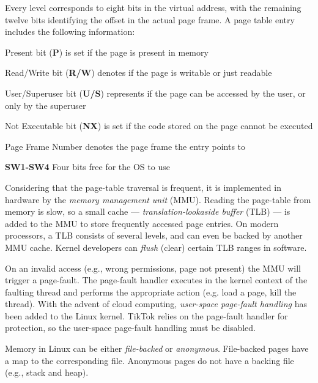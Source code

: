\documentclass[conference]{IEEEtran}
\newcommand{\sysname}{TikTok}
\begin{document}
Every level corresponds to eight bits in the virtual address, with the remaining twelve
bits identifying the offset in the actual page frame. A page table entry
includes the following information:
\begin{LaTeXdescription}
    \item[Present bit (\textbf{P})] is set if the page is present in memory
    \item[Read/Write bit (\textbf{R/W})] denotes if the page is writable or just
         readable
    \item[User/Superuser bit (\textbf{U/S})] represents if the page can be 
    accessed by the user, or only by the superuser
    \item[Not Executable bit (\textbf{NX})] is set if the code stored on the 
    page cannot be executed
    \item[Page Frame Number] denotes the page frame the entry points to
    \item[\textbf{SW1-SW4}] Four bits free for the OS to use
\end{LaTeXdescription}

Considering that the page-table traversal is frequent, it is implemented in
hardware by the \emph{memory management unit} (MMU). Reading the page-table from
memory is slow, so a small cache --- \emph{translation-lookaside buffer} (TLB)
--- is added to the MMU to store frequently accessed page entries. On modern
processors, a TLB consists of several levels, and can even be backed by another
MMU cache. Kernel developers can \emph{flush} (clear) certain TLB ranges in
software.

On an invalid access (e.g., wrong permissions, page not present) the MMU will
trigger a page-fault. The page-fault handler executes in the kernel context of
the faulting thread and performs the appropriate action (e.g. load a page, kill
the thread). With the advent of cloud computing, \emph{user-space page-fault
handling} has been added to the Linux kernel. \sysname{} relies on the page-fault
handler for protection, so the user-space page-fault handling must be disabled.

Memory in Linux can be either \emph{file-backed} or \emph{anonymous}.
File-backed pages have a map to the corresponding file. Anonymous pages do not
have a backing file (e.g., stack and heap).
\end{document}
